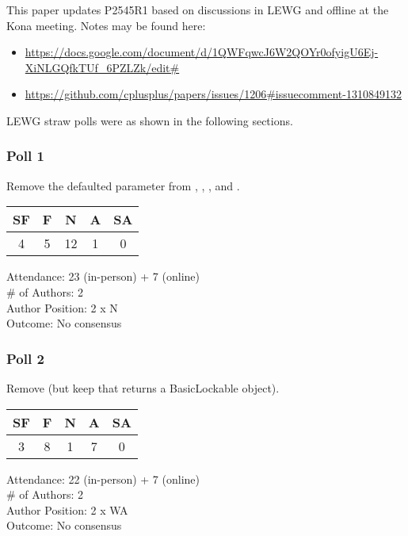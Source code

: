 This paper updates P2545R1 based on discussions in LEWG and offline
at the Kona meeting.
Notes may be found here:

\begin{itemize}
\item	\url{https://docs.google.com/document/d/1QWFqwcJ6W2QOYr0ofyigU6Ej-XiNLGQfkTUf_6PZLZk/edit#}
\item	\url{https://github.com/cplusplus/papers/issues/1206#issuecomment-1310849132}
\end{itemize}

LEWG straw polls were as shown in the following sections.

\subsubsection{Poll 1}
\label{sec:kona2022:Poll 1}

Remove the defaulted  parameter from
, , , and
.

\begin{tabular}{c|c|c|c|c}
SF & F &  N & A & SA \\
\hline
 4 & 5 & 12 & 1 &  0 \\
\end{tabular}

Attendance: 23 (in-person) + 7 (online) \\
\# of Authors: 2 \\
Author Position: 2 x N \\
Outcome: No consensus

\subsubsection{Poll 2}
\label{sec:kona2022:Poll 2}

Remove  (but keep  that returns a BasicLockable object).

\begin{tabular}{c|c|c|c|c}
SF & F &  N & A & SA \\
\hline
 3 & 8 &  1 & 7 &  0 \\
\end{tabular}

Attendance: 22 (in-person) + 7 (online) \\
\# of Authors: 2 \\
Author Position: 2 x WA \\
Outcome: No consensus

